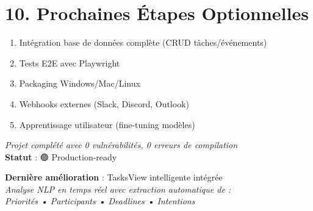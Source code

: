 \documentclass[12pt,french]{article}
\begin{document}
\vspace{0.5cm}

\section*{10. Prochaines Étapes Optionnelles}

\begin{enumerate}
    \item Intégration base de données complète (CRUD tâches/événements)
    \item Tests E2E avec Playwright
    \item Packaging Windows/Mac/Linux
    \item Webhooks externes (Slack, Discord, Outlook)
    \item Apprentissage utilisateur (fine-tuning modèles)
\end{enumerate}

\vfill

\begin{center}
\textit{Projet complété avec 0 vulnérabilités, 0 erreurs de compilation} \\
\textbf{Statut} : 🟢 Production-ready

\vspace{1cm}

\textbf{Dernière amélioration} : TasksView intelligente intégrée \\
\textit{Analyse NLP en temps réel avec extraction automatique de :} \\
\textit{Priorités • Participants • Deadlines • Intentions}
\end{center}
\end{document}
